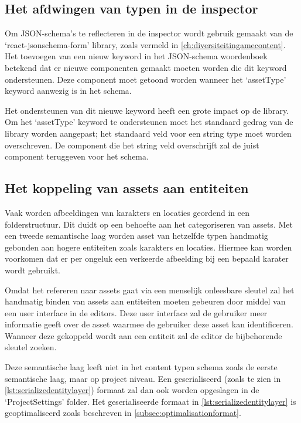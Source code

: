 \subsection{Het afdwingen van typen in de inspector}
Om JSON-schema’s te reflecteren in de inspector wordt gebruik gemaakt van de ‘react-jsonschema-form’ library, zoals vermeld in \autoref{ch:diversiteitingamecontent}. Het toevoegen van een nieuw keyword in het JSON-schema woordenboek betekend dat er nieuwe componenten gemaakt moeten worden die dit keyword ondersteunen. Deze component moet getoond worden wanneer het ‘assetType’ keyword aanwezig is in het schema.

Het ondersteunen van dit nieuwe keyword heeft een grote impact op de library. Om het ‘assetType’ keyword te ondersteunen moet het standaard gedrag van de library worden aangepast; het standaard veld voor een string type moet worden overschreven. De component die het string veld overschrijft zal de juist component teruggeven voor het schema.

\pagebreak

\subsection{Het koppeling van assets aan entiteiten}
Vaak worden afbeeldingen van karakters en locaties geordend in een folderstructuur. Dit duidt op een behoefte aan het categoriseren van assets. Met een tweede semantische laag worden asset van hetzelfde typen handmatig gebonden aan hogere entiteiten zoals karakters en locaties. Hiermee kan worden voorkomen dat er per ongeluk een verkeerde afbeelding bij een bepaald karater wordt gebruikt.

Omdat het refereren naar assets gaat via een menselijk onleesbare sleutel zal het handmatig binden van assets aan entiteiten moeten gebeuren door middel van een user interface in de editors. Deze user interface zal de gebruiker meer informatie geeft over de asset waarmee de gebruiker deze asset kan identificeren. Wanneer deze gekoppeld wordt aan een entiteit zal de editor de bijbehorende sleutel zoeken.

Deze semantische laag leeft niet in het content typen schema zoals de eerste semantische laag, maar op project niveau. Een geserialiseerd (zoals te zien in \autoref{lst:serializedentitylayer}) formaat zal dan ook worden opgeslagen in de ‘ProjectSettings’ folder. Het geserialiseerde formaat in \autoref{lst:serializedentitylayer} is geoptimaliseerd zoals beschreven in \autoref{subsec:optimalisationformat}.

